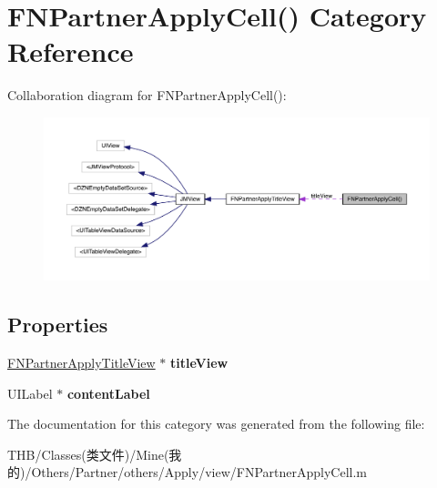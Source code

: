 \hypertarget{category_f_n_partner_apply_cell_07_08}{}\section{F\+N\+Partner\+Apply\+Cell() Category Reference}
\label{category_f_n_partner_apply_cell_07_08}


Collaboration diagram for F\+N\+Partner\+Apply\+Cell()\+:\nopagebreak
\begin{figure}[H]
\begin{center}
\leavevmode
\includegraphics[width=350pt]{category_f_n_partner_apply_cell_07_08__coll__graph}
\end{center}
\end{figure}
\subsection*{Properties}
\begin{DoxyCompactItemize}
\item 
\mbox{\label{category_f_n_partner_apply_cell_07_08_a335176636902af69f41b38198731e98c}} 
\mbox{\hyperlink{interface_f_n_partner_apply_title_view}{F\+N\+Partner\+Apply\+Title\+View}} $\ast$ {\bfseries title\+View}
\item 
\mbox{\label{category_f_n_partner_apply_cell_07_08_a42ae262bbc6fc0b2572b0351c8f659f0}} 
U\+I\+Label $\ast$ {\bfseries content\+Label}
\end{DoxyCompactItemize}


The documentation for this category was generated from the following file\+:\begin{DoxyCompactItemize}
\item 
T\+H\+B/\+Classes(类文件)/\+Mine(我的)/\+Others/\+Partner/others/\+Apply/view/F\+N\+Partner\+Apply\+Cell.\+m\end{DoxyCompactItemize}
